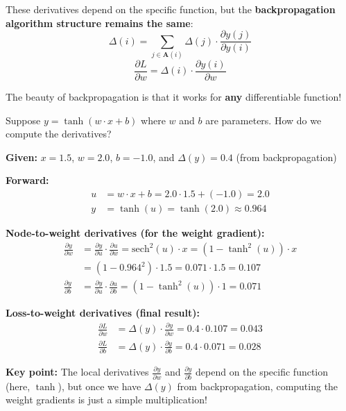 \begin{notechapter}
\begin{tcolorbox}[colback=orange!5,colframe=orange!80,title=Important: General Functions]
These derivatives depend on the specific function, but the \textbf{backpropagation algorithm structure remains the same}:
$$\Delta(i) = \sum_{j \in \mathbf{A}(i)} \Delta(j) \cdot \frac{\partial y(j)}{\partial y(i)}$$
$$\frac{\partial L}{\partial w} = \Delta(i) \cdot \frac{\partial y(i)}{\partial w}$$

The beauty of backpropagation is that it works for \textbf{any} differentiable function!
\end{tcolorbox}

\begin{example}
Suppose $y = \tanh(w \cdot x + b)$ where $w$ and $b$ are parameters. How do we compute the derivatives?

\textbf{Given:} $x = 1.5$, $w = 2.0$, $b = -1.0$, and $\Delta(y) = 0.4$ (from backpropagation)

\textbf{Forward:}
\begin{align*}
u &= w \cdot x + b = 2.0 \cdot 1.5 + (-1.0) = 2.0\\
y &= \tanh(u) = \tanh(2.0) \approx 0.964
\end{align*}

\textbf{Node-to-weight derivatives (for the weight gradient):}
\begin{align*}
\frac{\partial y}{\partial w} &= \frac{\partial y}{\partial u} \cdot \frac{\partial u}{\partial w} = \text{sech}^2(u) \cdot x = (1 - \tanh^2(u)) \cdot x\\
&= (1 - 0.964^2) \cdot 1.5 = 0.071 \cdot 1.5 = 0.107\\[0.3em]
\frac{\partial y}{\partial b} &= \frac{\partial y}{\partial u} \cdot \frac{\partial u}{\partial b} = (1 - \tanh^2(u)) \cdot 1 = 0.071
\end{align*}

\textbf{Loss-to-weight derivatives (final result):}
\begin{align*}
\frac{\partial L}{\partial w} &= \Delta(y) \cdot \frac{\partial y}{\partial w} = 0.4 \cdot 0.107 = 0.043\\
\frac{\partial L}{\partial b} &= \Delta(y) \cdot \frac{\partial y}{\partial b} = 0.4 \cdot 0.071 = 0.028
\end{align*}

\textbf{Key point:} The local derivatives $\frac{\partial y}{\partial w}$ and $\frac{\partial y}{\partial b}$ depend on the specific function (here, $\tanh$), but once we have $\Delta(y)$ from backpropagation, computing the weight gradients is just a simple multiplication!
\end{example}


\end{notechapter}
